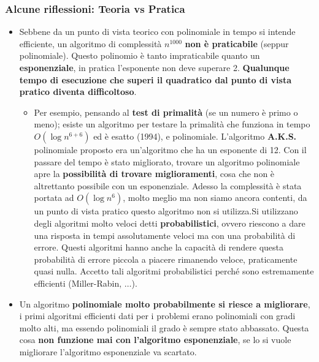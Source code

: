 \documentclass{article}
\begin{document}
\subsubsection{Alcune riflessioni: Teoria vs Pratica}
\begin{itemize}
    \item Sebbene da un punto di vista teorico con polinomiale in tempo si intende efficiente,
          un algoritmo di complessità $n^{1000}$ \textbf{non è praticabile} (seppur polinomiale).
          Questo polinomio è tanto impraticabile quanto un \textbf{esponenziale},
          in pratica l'esponente non deve superare 2. \textbf{Qualunque tempo di esecuzione che superi il quadratico dal punto
          di vista pratico diventa difficoltoso}.
          \begin{itemize}
              \item Per esempio, pensando al \textbf{test di primalità} (se un numero è primo o meno); esiste
                    un algoritmo per testare la primalità che funziona in tempo $O(\log n^{6+6})$ ed
                    è esatto (1994), e polinomiale.\newline\newline
                    L'algoritmo \textbf{A.K.S.} polinomiale proposto era un'algoritmo
                    che ha un esponente di 12. Con il passare del tempo è stato migliorato, trovare un
                    algoritmo polinomiale apre la \textbf{possibilità di trovare miglioramenti}, cosa che non è
                    altrettanto possibile con un esponenziale. Adesso la complessità è stata portata
                    ad $O(\log n^6)$, molto meglio ma non siamo ancora contenti, da un punto di vista
                    pratico questo algoritmo non si utilizza.\newline\newline Si utilizzano degli algoritmi molto veloci detti
                    \textbf{probabilistici}, ovvero riescono a dare una risposta in tempi assolutamente veloci ma con una
                    probabilità di errore. Questi algoritmi hanno anche la capacità di rendere questa probabilità
                    di errore piccola a piacere rimanendo veloce, praticamente quasi nulla. Accetto tali algoritmi
                    probabilistici perché sono estremamente efficienti (Miller-Rabin, $\dots$).
          \end{itemize}

    \item Un algoritmo \textbf{polinomiale molto probabilmente si riesce a migliorare}, i primi algoritmi
          efficienti dati per i problemi erano polinomiali con gradi molto alti, ma essendo polinomiali
          il grado è sempre stato abbassato. Questa cosa \textbf{non funzione mai con l'algoritmo esponenziale},
          se lo si vuole migliorare l'algoritmo esponenziale va scartato.


\end{itemize}
\end{document}
